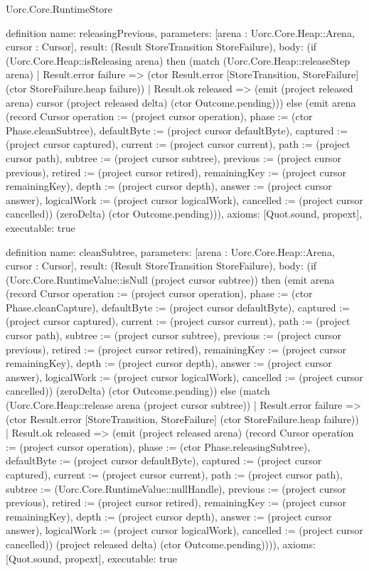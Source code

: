 \begin{lexlean}{Uorc.Core.RuntimeStore}
\begin{semanticmodule}
definition{
  name: releasingPrevious,
  parameters: [arena : Uorc.Core.Heap::Arena, cursor : Cursor],
  result: (Result StoreTransition StoreFailure),
  body: (if (Uorc.Core.Heap::isReleasing arena) then (match (Uorc.Core.Heap::releaseStep arena)
    | Result.error failure => (ctor Result.error [StoreTransition, StoreFailure] (ctor StoreFailure.heap failure))
    | Result.ok released => (emit (project released arena) cursor (project released delta) (ctor Outcome.pending))) else (emit arena (record Cursor {operation := (project cursor operation), phase := (ctor Phase.cleanSubtree), defaultByte := (project cursor defaultByte), captured := (project cursor captured), current := (project cursor current), path := (project cursor path), subtree := (project cursor subtree), previous := (project cursor previous), retired := (project cursor retired), remainingKey := (project cursor remainingKey), depth := (project cursor depth), answer := (project cursor answer), logicalWork := (project cursor logicalWork), cancelled := (project cursor cancelled)}) (zeroDelta) (ctor Outcome.pending))),
  axioms: [Quot.sound, propext],
  executable: true
}

definition{
  name: cleanSubtree,
  parameters: [arena : Uorc.Core.Heap::Arena, cursor : Cursor],
  result: (Result StoreTransition StoreFailure),
  body: (if (Uorc.Core.RuntimeValue::isNull (project cursor subtree)) then (emit arena (record Cursor {operation := (project cursor operation), phase := (ctor Phase.cleanCapture), defaultByte := (project cursor defaultByte), captured := (project cursor captured), current := (project cursor current), path := (project cursor path), subtree := (project cursor subtree), previous := (project cursor previous), retired := (project cursor retired), remainingKey := (project cursor remainingKey), depth := (project cursor depth), answer := (project cursor answer), logicalWork := (project cursor logicalWork), cancelled := (project cursor cancelled)}) (zeroDelta) (ctor Outcome.pending)) else (match (Uorc.Core.Heap::release arena (project cursor subtree))
    | Result.error failure => (ctor Result.error [StoreTransition, StoreFailure] (ctor StoreFailure.heap failure))
    | Result.ok released => (emit (project released arena) (record Cursor {operation := (project cursor operation), phase := (ctor Phase.releasingSubtree), defaultByte := (project cursor defaultByte), captured := (project cursor captured), current := (project cursor current), path := (project cursor path), subtree := (Uorc.Core.RuntimeValue::nullHandle), previous := (project cursor previous), retired := (project cursor retired), remainingKey := (project cursor remainingKey), depth := (project cursor depth), answer := (project cursor answer), logicalWork := (project cursor logicalWork), cancelled := (project cursor cancelled)}) (project released delta) (ctor Outcome.pending)))),
  axioms: [Quot.sound, propext],
  executable: true
}


\end{semanticmodule}
\end{lexlean}
